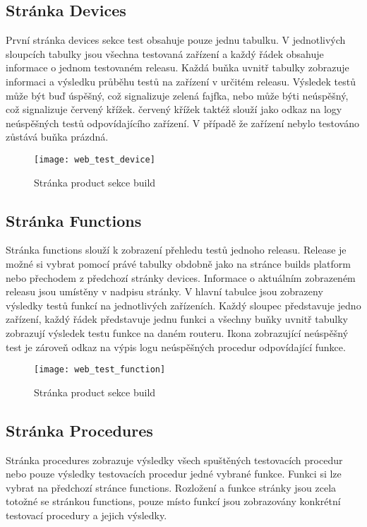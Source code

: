 \subsection{Stránka Devices}
První stránka devices sekce test obsahuje pouze jednu tabulku. V jednotlivých sloupcích tabulky jsou všechna testovaná zařízení a každý řádek obsahuje informace o jednom testovaném releasu. Každá buňka uvnitř tabulky zobrazuje informaci a výsledku průběhu testů na zařízení v určitém releasu. Výsledek testů může být buď úspěšný, což signalizuje zelená fajfka, nebo může býti neúspěšný, což signalizuje červený křížek. červený křížek taktéž slouží jako odkaz na logy neúspěšných testů odpovídajícího zařízení. V případě že zařízení nebylo testováno zůstává buňka prázdná.

\begin{figure}[h]
  \centering
  \texttt{[image: web\_test\_device]}
  \caption{Stránka product sekce build}
  \label{fig:web_test_device}
\end{figure}

\subsection{Stránka Functions}
Stránka functions slouží k zobrazení přehledu testů jednoho releasu. Release je možné si vybrat pomocí právé tabulky obdobně jako na stránce builds platform nebo přechodem z předchozí stránky devices. Informace o aktuálním zobrazeném releasu jsou umístěny v nadpisu stránky. V hlavní tabulce jsou zobrazeny výsledky testů funkcí na jednotlivých zařízeních. Každý sloupec představuje jedno zařízení, každý řádek představuje jednu funkci a všechny buňky uvnitř tabulky zobrazují výsledek testu funkce na daném routeru. Ikona zobrazující neúspěšný test je zároveň odkaz na výpis logu neúspěšných procedur odpovídající funkce.

\begin{figure}[h]
  \centering
  \texttt{[image: web\_test\_function]}
  \caption{Stránka product sekce build}
  \label{fig:web_test_device}
\end{figure}

\subsection{Stránka Procedures}
Stránka procedures zobrazuje výsledky všech spuštěných testovacích procedur nebo pouze výsledky testovacích procedur jedné vybrané funkce. Funkci si lze vybrat na předchozí stránce functions. Rozložení a funkce stránky jsou zcela totožné se stránkou functions, pouze místo funkcí jsou zobrazovány konkrétní testovací procedury a jejich výsledky.

